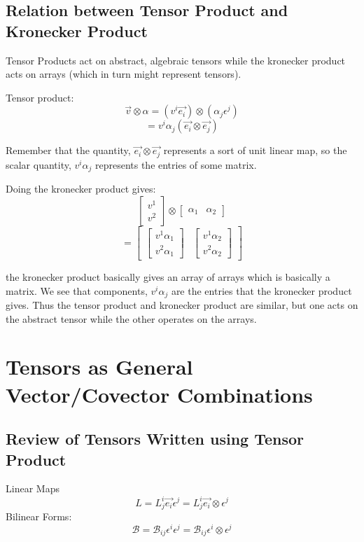\documentclass{report}
\begin{document}
\section{Relation between Tensor Product and Kronecker Product}
Tensor Products act on abstract, algebraic tensors while the kronecker product acts on arrays (which in turn might represent tensors).

Tensor product:
$$ \vec{v} \otimes \alpha = \left( v^i \vec{e_i} \right) \otimes \left( \alpha_j \epsilon^j \right) $$ 
$$ = v^i \alpha_j \left( \vec{e_i} \otimes \vec{e_j} \right) $$ 

Remember that the quantity, $\vec{e_i} \otimes \vec{e_j}$ represents a sort of unit linear map, so the scalar quantity, $v^i\alpha_j$ represents the entries of some matrix.

Doing the kronecker product gives:
$$ \begin{bmatrix} v^1 \\ v^2  \end{bmatrix} \otimes \begin{bmatrix} \alpha_1 & \alpha_2 \end{bmatrix}  $$ 
$$ = \begin{bmatrix} \begin{bmatrix} v^1 \alpha_1 \\ v^2 \alpha_1 \end{bmatrix} & \begin{bmatrix} v^1 \alpha_2 \\ v^2 \alpha_2 \end{bmatrix} \end{bmatrix} $$ 

the kronecker product basically gives an array of arrays which is basically a matrix. We see that components, $v^i \alpha_j $ are the entries that the kronecker product gives. Thus the tensor product and kronecker product are similar, but one acts on the abstract tensor while the other operates on the arrays.

\chapter{Tensors as General Vector/Covector Combinations}
\section{Review of Tensors Written using Tensor Product}
Linear Maps
$$ L = L_j^i \vec{e_i} \epsilon^j = L_j^i \vec{e_i}\otimes \epsilon^j $$ 
Bilinear Forms:
$$ \mathcal{B} = \mathcal{B}_{ij} \epsilon^i \epsilon^j  = \mathcal{B}_{ij} \epsilon^i \otimes \epsilon^j$$ 
\end{document}

